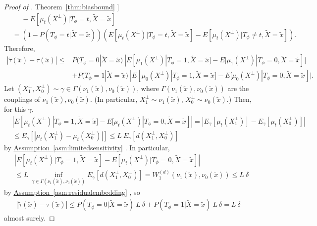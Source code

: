 \documentclass{article}
\theoremstyle{plain}
\theoremstyle{definition}
\theoremstyle{remark}
\newcommand{\myref}[2]{%
    \hyperref[#2]{#1~\ref*{#2}}%
}
\begin{document}
\begin{proof}[Proof of \myref{Theorem}{thm:biasbound}]
\begin{align*}
    &\phantom{=}
    -
    E[\mu_t(X^\perp)|T_\phi{=}t, \tilde{X}{=}\tilde{x}]
    \\
    &=
    (1 - P(T_\phi{=}t | \tilde{X}{=}\tilde{x}))
    (E[\mu_t(X^\perp)|T_\phi{=}t, \tilde{X}{=}\tilde{x}] - E[\mu_t(X^\perp)|T_\phi{\neq}t, \tilde{X}{=}\tilde{x}]).
\end{align*}
Therefore,
 \begin{align*}
     |\tilde{\tau}(\tilde{x}) - \tau(\tilde{x})|
     \leq
     &P(T_\phi{=}0 | \tilde{X}{=}\tilde{x}) \: |E[\mu_1(X^\perp)|T_\phi{=}1, \tilde{X}{=}\tilde{x}] - E[\mu_1(X^\perp)|T_\phi{=}0, \tilde{X}{=}\tilde{x}]|
     \\
     &+
     P(T_\phi{=}1 | \tilde{X}{=}\tilde{x}) \: |E[\mu_0(X^\perp)|T_\phi{=}1, \tilde{X}{=}\tilde{x}] - E[\mu_0(X^\perp)|T_\phi{=}0, \tilde{X}{=}\tilde{x}]|.
\end{align*}
Let $(X^\perp_1, X^\perp_0) \sim \gamma \in \Gamma(\nu_1(\tilde{x}),\nu_0(\tilde{x}))$, where $\Gamma(\nu_1(\tilde{x}),\nu_0(\tilde{x}))$ are the couplings of $\nu_1(\tilde{x}),\nu_0(\tilde{x})$.
(In particular, $X^\perp_1 \sim \nu_1(\tilde{x})$, $X^\perp_0 \sim \nu_0(\tilde{x})$.)
Then, for this $\gamma$,
\begin{align*}
    &|E[\mu_t(X^\perp)|T_\phi{=}1, \tilde{X}{=}\tilde{x}] - E[\mu_t(X^\perp)|T_\phi{=}0, \tilde{X}{=}\tilde{x}]|
    =
    |E_\gamma[\mu_t(X^\perp_1)] - E_\gamma[\mu_t(X^\perp_0)]|
    \\
    &\leq
    E_\gamma[|\mu_t(X^\perp_1) - \mu_t(X^\perp_0)|]
    \leq L \: E_\gamma[d(X^\perp_1, X^\perp_0)]
\end{align*}
by \myref{Assumption}{asm:limitedsensitivity}.
In particular, 
\begin{align*}
    &\left|E[\mu_t(X^\perp)|T_\phi{=}1, \tilde{X}{=}\tilde{x}] - E[\mu_t(X^\perp)|T_\phi{=}0, \tilde{X}{=}\tilde{x}]\right| 
    \\
    &\leq L \: \inf_{\gamma \in \Gamma(\nu_1(\tilde{x}),\nu_0(\tilde{x}))} E_\gamma[d(X^\perp_1, X^\perp_0)] = W_1^{(d)}(\nu_1(\tilde{x}),\nu_0(\tilde{x}))
    \leq
    L \: \delta
\end{align*}
by \myref{Assumption}{asm:residualembedding},
so
\begin{align*}
    |\tilde{\tau}(\tilde{x}) - \tau(\tilde{x})|
     \leq
     P(T_\phi{=}0 | \tilde{X}{=}\tilde{x}) \: L \: \delta
     +
     P(T_\phi{=}1 | \tilde{X}{=}\tilde{x})  \: L \: \delta
     = L \: \delta
\end{align*}
almost surely.
\end{proof}
\end{document}
